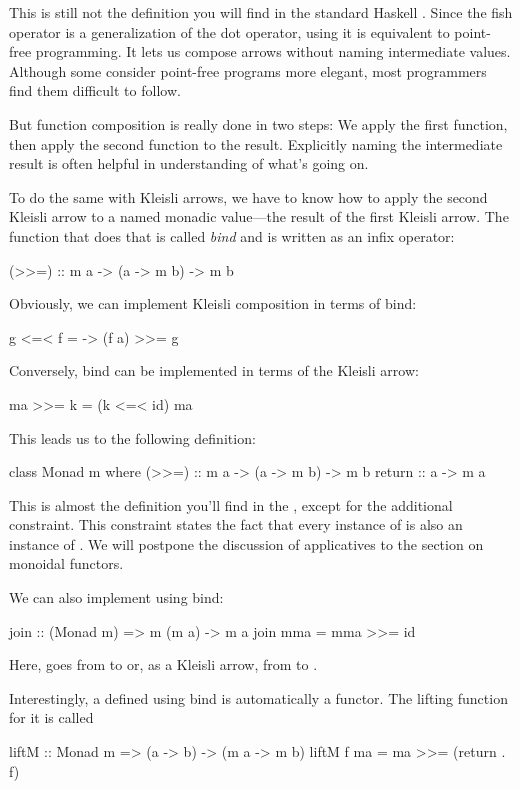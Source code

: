 \documentclass[DaoFP]{subfiles}
\begin{document}
This is still not the definition you will find in the standard Haskell . Since the fish operator is a generalization of the dot operator, using it is equivalent to point-free programming. It lets us compose arrows without naming intermediate values. Although some consider point-free programs more elegant, most programmers find them difficult to follow. 

But function composition is really done in two steps: We apply the first function, then apply the second function to the result. Explicitly naming the intermediate result is often helpful in understanding of what's going on.

To do the same with Kleisli arrows, we have to know how to apply the second Kleisli arrow to a named monadic value---the result of the first Kleisli arrow. The function that does that is called \emph{bind} and is written as an infix operator:
\begin{haskell}
(>>=) :: m a -> (a -> m b) -> m b
\end{haskell}
Obviously, we can implement Kleisli composition in terms of bind:

\begin{haskell}
g <=< f = \a -> (f a) >>= g
\end{haskell}

Conversely, bind can be implemented in terms of the Kleisli arrow:
\begin{haskell}
ma >>= k = (k <=< id) ma
\end{haskell}

This leads us to the following definition:
\begin{haskell}
class Monad m where
  (>>=) :: m a -> (a -> m b) -> m b
  return :: a -> m a 
\end{haskell}
This is almost the definition you'll find in the , except for the additional constraint. This constraint states the fact that every instance of  is also an instance of . We will postpone the discussion of applicatives to the section on monoidal functors.

We can also implement  using bind:
\begin{haskell}
join  :: (Monad m) => m (m a) -> m a
join mma =  mma >>= id
\end{haskell}
Here,  goes from  to  or, as a Kleisli arrow, from   to .

Interestingly, a  defined using bind is automatically a functor. The lifting function for it is called 
\begin{haskell}
liftM :: Monad m => (a -> b) -> (m a -> m b)
liftM f ma = ma >>= (return . f)
\end{haskell}
\end{document}
